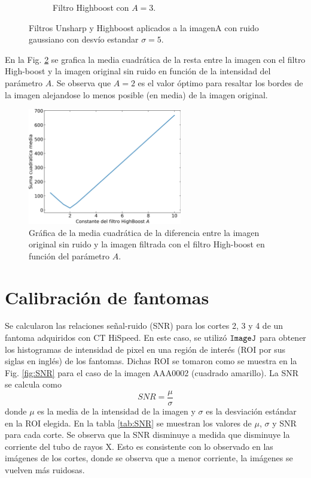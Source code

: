 \documentclass[letterpaper,12pt]{article}
\theoremstyle{plain}
\begin{document}
\begin{figure}[H]
\begin{subfigure}[h]{0.2\textwidth}
           \caption{Filtro Highboost con $A=3$.} 
        \end{subfigure}
   \caption{Filtros Unsharp y Highboost aplicados a la imagenA con ruido gaussiano con desvío estandar $\sigma =5$.}
   \label{fig:highunsharp}
\end{figure}

En la Fig. \ref{fig:plot_highboost} se grafica la media cuadrática de la resta entre la imagen con el filtro High-boost y la imagen original sin ruido en función de la intensidad del parámetro $A$. Se observa que $A=2$ es el valor óptimo para resaltar los bordes de la imagen alejandose lo menos posible (en media) de la imagen original.

\begin{figure}[H]
    \centering
         \includegraphics[width=0.6\textwidth]{Figuras/Highboost_plot.png}
    \caption{Gráfica de la media cuadrática de la diferencia entre la imagen original sin ruido y la imagen filtrada con el filtro High-boost en función del parámetro $A$.}
    \label{fig:plot_highboost}
\end{figure}

\section{Calibración de fantomas\label{sec:ej7}}

\vspace{0.3cm}

Se calcularon las relaciones señal-ruido (SNR) para los cortes 2, 3 y 4 de un fantoma adquiridos con CT HiSpeed. En este caso, se utilizó $\verb|ImageJ|$ para obtener los histogramas de intensidad de pixel en una región de interés (ROI por sus siglas en inglés) de los fantomas. Dichas ROI se tomaron como se muestra en la Fig. \ref{fig:SNR} para el caso de la imagen AAA0002 (cuadrado amarillo). La SNR se calcula como 
\begin{equation}
    SNR = \frac{\mu}{\sigma}
\end{equation}
donde $\mu$ es la media de la intensidad de la imagen y $\sigma$ es la desviación estándar en la ROI elegida. En la tabla \ref{tab:SNR} se muestran los valores de $\mu$, $\sigma$ y SNR para cada corte. Se observa que la SNR disminuye a medida que disminuye la corriente del tubo de rayos X. Esto es consistente con lo observado en las imágenes de los cortes, donde se observa que a menor corriente, la imágenes se vuelven más ruidosas.
\end{document}
